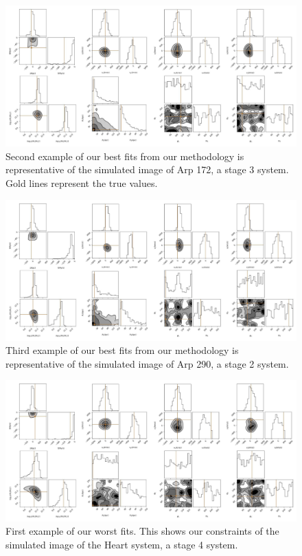 \begin{figure}
\centering
\includegraphics[width=\textwidth]{Chapter1/figures/Arp172-red-corner.pdf}
\caption[Second example of our best fits from our methodology is representative of the simulated image of Arp 172, a stage 3 system.]{Second example of our best fits from our methodology is representative of the simulated image of Arp 172, a stage 3 system. Gold lines represent the true values.}
\label{fig:best-Arp172}
\end{figure}

\begin{figure}
\centering
\includegraphics[width=\textwidth]{Chapter1/figures/Arp290-red-corner.pdf}
\caption[Third example of our best fits from our methodology is representative of the simulated image of Arp 290, a stage 2 system.]{Third example of our best fits from our methodology is representative of the simulated image of Arp 290, a stage 2 system.}
\label{fig:best-Arp290}
\end{figure}

\begin{figure}
\centering
\includegraphics[width=\textwidth]{Chapter1/figures/Heart-red-corner.pdf}
\caption[First example of our worst fits.]{First example of our worst fits. This shows our constraints of the simulated image of the Heart system, a stage 4 system.}
\label{fig:worst-Heart}
\end{figure}

